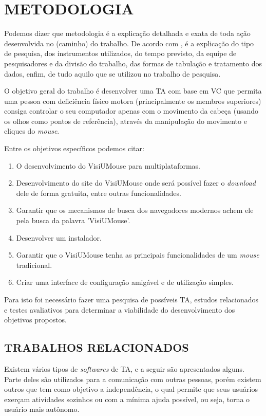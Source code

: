 \chapter{METODOLOGIA}\label{CAP3}

Podemos dizer que metodologia é a explicação detalhada e exata de toda ação desenvolvida no (caminho) do trabalho. De acordo com , é a explicação do tipo de pesquisa, dos instrumentos utilizados, do tempo previsto, da equipe de pesquisadores e da divisão do trabalho, das formas de tabulação e tratamento dos dados, enfim, de tudo aquilo que se utilizou no trabalho de pesquisa.

O objetivo geral do trabalho é desenvolver uma TA com base em VC que permita uma pessoa com deficiência físico motora (principalmente os membros superiores) consiga controlar o seu computador apenas com o movimento da cabeça (usando os olhos como pontos de referência), através da manipulação do movimento e cliques do \textit{mouse}.


Entre os objetivos específicos podemos citar: 
\begin{enumerate}
\item O desenvolvimento do VisiUMouse para multiplataformas.
\item Desenvolvimento do site do VisiUMouse onde será possível fazer o \textit{download} dele de forma gratuita, entre outras funcionalidades.
\item Garantir que os mecanismos de busca dos navegadores modernos achem ele pela busca da palavra 'VisiUMouse'.
\item Desenvolver um instalador.
\item Garantir que o VisiUMouse tenha as principais funcionalidades de um \textit{mouse} tradicional.
\item Criar uma interface de configuração amigável e de utilização simples.
\end{enumerate}

Para isto foi necessário fazer uma pesquisa de possíveis TA, estudos relacionados e testes avaliativos para determinar a viabilidade do desenvolvimento dos objetivos propostos.
    
\section{TRABALHOS RELACIONADOS}\label{Sub:trabalhos-relacionados}

Existem vários tipos de  \textit{softwares} de TA, e a seguir são apresentados alguns. Parte deles são utilizados para a comunicação com outras pessoas, porém existem outros que tem como objetivo a independência, o qual permite que seus usuários exerçam atividades sozinhos ou com a mínima ajuda possível, ou seja, torna o usuário mais autônomo.

